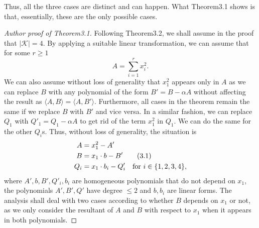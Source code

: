 \documentclass[10pt,a4paper]{article}
\def\Rational{\mathbb{Q}}
\let\Q\Rational
\begin{document}
Thus, all the three cases are distinct and can happen. What Theorem3.1 shows is that, essentially, these are the only possible cases.
\begin{proof}[Author proof of Theorem3.1]
Following Theorem3.2, we shall assume in the proof that $|\mathcal K|=4$. By applying a suitable linear transformation, we can assume that for some $r\geq1$
\[A=\sum_{i=1}^rx_i^2.\]
We can also assume without loss of generality that $x_1^2$ appears only in $A$ as we can replace $B$ with any polynomial of the form $B'=B-\alpha A$ without affecting the result as $\langle A,B\rangle=\langle A,B'\rangle$. Furthermore, all cases in the theorem remain the same if we replace $B$ with $B'$ and vice versa.
In a similar fashion, we can replace $Q_1$ with $Q'_1=Q_1-\alpha A$ to get rid of the term $x_1^2$ in $Q_1$. We can do the same for the other $Q_i$s. Thus, without loss of generality, the situation is
\begin{align}A&=x_1^2-A'\notag\\B&=x_1\cdot b-B'\tag{3.1}\\Q_i&=x_1\cdot b_i-Q'_i\quad\text{for }i\in\{1,2,3,4\},\notag\end{align}
where $A',b,B',Q'_i,b_i$ are homogeneous polynomials that do not depend on $x_1$, the polynomials $A',B',Q'$ have degree $\leq2$ and $b,b_i$ are linear forms. The analysis shall deal with two cases according to whether $B$ depends on $x_1$ or not, as we only consider the resultant of $A$ and $B$ with respect to $x_1$ when it appears in both polynomials.

\end{proof}
\end{document}
